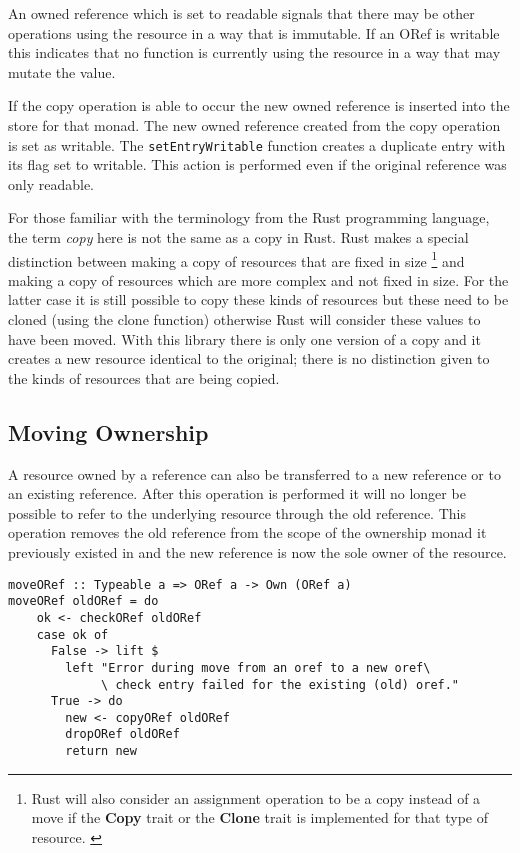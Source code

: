 \documentclass[onehalf,11pt]{beavtex}
\begin{document}
An owned reference which is set to readable signals that there may be other
operations using the resource in a way that is immutable.
If an ORef is writable this indicates that no function is currently using the
resource in a way that may mutate the value.

If the copy operation is able to occur the new owned reference is inserted into
the store for that monad.  The new owned reference created from the copy
operation is set as writable. The \texttt{setEntryWritable} function
creates a duplicate entry with its flag set to writable.
This action is performed even if the original reference was only
readable.

For those familiar with the terminology from the Rust programming language, the
term \textit{copy} here is not the same as a copy in Rust. Rust makes a special
distinction between making a copy of resources that are fixed in size
\footnote{Rust will also consider an assignment operation to be a copy instead
  of a move if the \textbf{Copy} trait or the \textbf{Clone} trait is
  implemented for that type of resource. \cite{rust_book_traits}
  \cite{rust_docs_clone_trait}}
and making a copy of resources which are more complex and not fixed in size.
For the latter case it is still possible to copy these kinds of resources but these
need to be cloned (using the clone function) otherwise Rust will consider these
values to have been moved. \cite{rust_book_ownership}
With this library there is only one version of a copy and it creates a new
resource identical to the original; there is no distinction given to the kinds
of resources that are being copied.

\subsection{Moving Ownership}

A resource owned by a reference can also be transferred to a new reference or
to an existing reference. After this operation is performed it will no longer
be possible to refer to the underlying resource through the old reference. This
operation removes the old reference from the scope of the ownership monad it
previously existed in and the new reference is now the sole owner of the
resource.

\begin{verbatim}
moveORef :: Typeable a => ORef a -> Own (ORef a)
moveORef oldORef = do
    ok <- checkORef oldORef
    case ok of
      False -> lift $
        left "Error during move from an oref to a new oref\
             \ check entry failed for the existing (old) oref."
      True -> do
        new <- copyORef oldORef
        dropORef oldORef
        return new
\end{verbatim}
\end{document}
